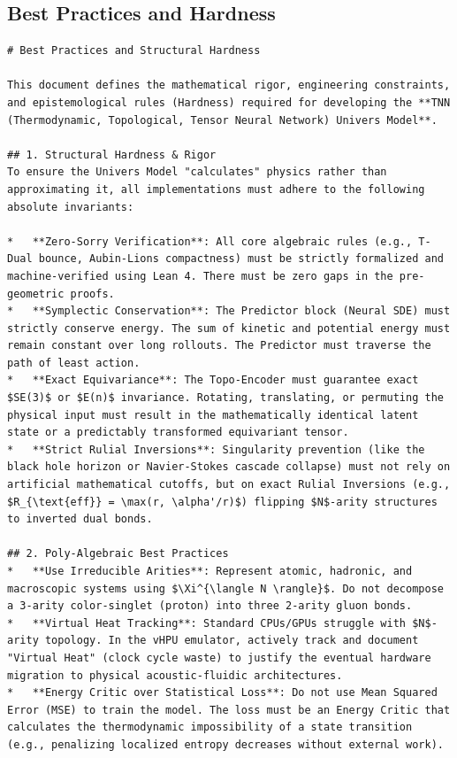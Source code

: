 \documentclass[11pt,a4paper]{article}
\begin{document}
\subsection{Best Practices and Hardness}
\begin{lstlisting}[language={}, caption={}, basicstyle=\ttfamily\footnotesize, breaklines=true]
# Best Practices and Structural Hardness

This document defines the mathematical rigor, engineering constraints, and epistemological rules (Hardness) required for developing the **TNN (Thermodynamic, Topological, Tensor Neural Network) Univers Model**.

## 1. Structural Hardness & Rigor
To ensure the Univers Model "calculates" physics rather than approximating it, all implementations must adhere to the following absolute invariants:

*   **Zero-Sorry Verification**: All core algebraic rules (e.g., T-Dual bounce, Aubin-Lions compactness) must be strictly formalized and machine-verified using Lean 4. There must be zero gaps in the pre-geometric proofs.
*   **Symplectic Conservation**: The Predictor block (Neural SDE) must strictly conserve energy. The sum of kinetic and potential energy must remain constant over long rollouts. The Predictor must traverse the path of least action.
*   **Exact Equivariance**: The Topo-Encoder must guarantee exact $SE(3)$ or $E(n)$ invariance. Rotating, translating, or permuting the physical input must result in the mathematically identical latent state or a predictably transformed equivariant tensor.
*   **Strict Rulial Inversions**: Singularity prevention (like the black hole horizon or Navier-Stokes cascade collapse) must not rely on artificial mathematical cutoffs, but on exact Rulial Inversions (e.g., $R_{\text{eff}} = \max(r, \alpha'/r)$) flipping $N$-arity structures to inverted dual bonds.

## 2. Poly-Algebraic Best Practices
*   **Use Irreducible Arities**: Represent atomic, hadronic, and macroscopic systems using $\Xi^{\langle N \rangle}$. Do not decompose a 3-arity color-singlet (proton) into three 2-arity gluon bonds.
*   **Virtual Heat Tracking**: Standard CPUs/GPUs struggle with $N$-arity topology. In the vHPU emulator, actively track and document "Virtual Heat" (clock cycle waste) to justify the eventual hardware migration to physical acoustic-fluidic architectures.
*   **Energy Critic over Statistical Loss**: Do not use Mean Squared Error (MSE) to train the model. The loss must be an Energy Critic that calculates the thermodynamic impossibility of a state transition (e.g., penalizing localized entropy decreases without external work).


\end{lstlisting}
\end{document}
